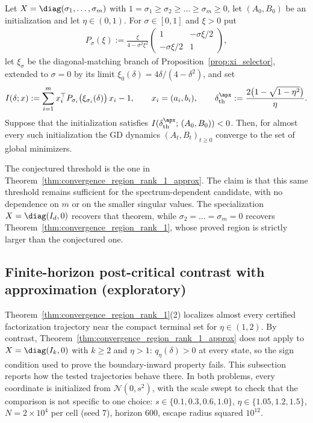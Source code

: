 \documentclass{article}
\begin{document}
\begin{conjecture}
\label{conj:equal_spectrum_extremal}
Let $X=\diag(\sigma_1,\dots,\sigma_m)$ with
$1=\sigma_1\ge\sigma_2\ge\dots\ge\sigma_m\ge0$, let $(A_0,B_0)$ be an
initialization and let $\eta\in(0,1)$. For $\sigma\in[0,1]$ and $\xi>0$ put
\begin{align}
    P_\sigma(\xi)
    :=
    \frac{\xi}{4-\sigma^2\xi^2}
    \begin{pmatrix} 1 & -\sigma\xi/2 \\ -\sigma\xi/2 & 1 \end{pmatrix},
    \label{eq:apxL_block_certificate_matrix}
\end{align}
let $\xi_\sigma$ be the diagonal-matching branch of
Proposition~\ref{prop:xi_selector}, extended to $\sigma=0$ by its limit
$\xi_0(\delta)=4\delta/(4-\delta^2)$, and set
\begin{align}
    I(\delta;x)
    :=
    \sum_{i=1}^m x_i^\top P_{\sigma_i}\bigl(\xi_{\sigma_i}(\delta)\bigr)\,x_i-1,
    \qquad x_i=(a_i,b_i),
    \qquad
    \delta_{\mathrm{th}}^\apx
    :=
    \frac{2\bigl(1-\sqrt{1-\eta^2}\bigr)}{\eta}.
    \label{eq:apxL_conjectured_certificate}
\end{align}
Suppose that the initialization satisfies
$I(\delta_{\mathrm{th}}^\apx;\,(A_0,B_0))<0$. Then, for almost every such
initialization the GD dynamics $(A_t,B_t)_{t\ge0}$ converge to the set of
global minimizers.
\end{conjecture}

The conjectured threshold is the one in
Theorem~\ref{thm:convergence_region_rank_1_approx}. The claim is that this same
threshold remains sufficient for the spectrum-dependent candidate, with no
dependence on $m$ or on the smaller singular values. The specialization
$X=\diag(I_d,0)$ recovers that theorem, while
$\sigma_2=\dots=\sigma_m=0$ recovers
Theorem~\ref{thm:convergence_region_rank_1}, whose proved region is strictly
larger than the conjectured one.

\subsection{Finite-horizon post-critical contrast with approximation
(exploratory)}
\label{apx:finite_time_dynamics}
\label{apx:postcritical}

Theorem~\ref{thm:convergence_region_rank_1}(2) localizes almost every certified
factorization trajectory near the compact terminal set for $\eta\in(1,2)$.
By contrast, Theorem~\ref{thm:convergence_region_rank_1_approx} does not apply
to $X=\diag(I_k,0)$ with $k\ge2$ and $\eta>1$: $q_\eta(\delta)>0$ at every
state, so the sign condition used to prove the boundary-inward property fails.
This subsection reports how the tested trajectories behave there. In both
problems, every coordinate is initialized from $\mathcal N(0,s^2)$, with the
scale swept to check that the comparison is not specific to one choice:
$s\in\{0.1,0.3,0.6,1.0\}$, $\eta\in\{1.05,1.2,1.5\}$, $N=2\times10^4$ per cell
(seed $7$), horizon $600$, escape radius squared $10^{12}$.
\end{document}
